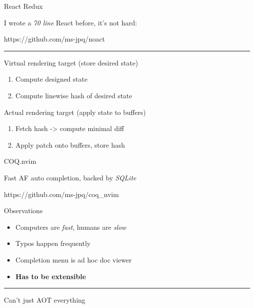 \documentclass{beamer}
\begin{document}
\begin{frame}{React Redux}

	I wrote a \textit{70 line} React before, it's not hard:

	https://github.com/ms-jpq/noact

	\rule{\textwidth}{0.1em}

	Virtual rendering target (store desired state)

	\begin{enumerate}

		\item Compute designed state

		\item Compute linewise hash of desired state

	\end{enumerate}

	Actual rendering target (apply state to buffers)

	\begin{enumerate}

		\item Fetch hash -> compute minimal diff

		\item Apply patch onto buffers, store hash

	\end{enumerate}

\end{frame}


\begin{frame}{COQ.nvim}

	Fast AF auto completion, backed by \textit{SQLite}

	https://github.com/ms-jpq/coq\_nvim

	\begin{block}{Observations}

		\begin{itemize}

			\item Computers are \textit{fast}, humans are \textit{slow}

			\item Typos happen frequently

			\item Completion menu is ad hoc doc viewer

			\item \textbf{Has to be extensible}

		\end{itemize}

	\end{block}

	\rule{\textwidth}{0.1em}

	Can't just AOT everything

\end{frame}
\end{document}
